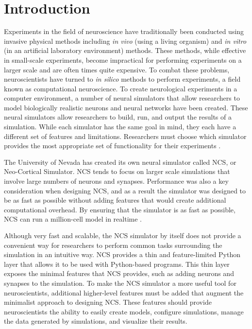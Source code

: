 \chapter{Introduction}
\label{chapter:intro}

Experiments in the field of neuroscience have traditionally been conducted using invasive physical methods including \emph{in vivo} (using a living organism) and \emph{in vitro} (in an artificial laboratory environment) methods. These methods, while effective in small-scale experiments, become impractical for performing experiments on a larger scale and are often times quite expensive. To combat these problems, neuroscientists have turned to \emph{in silico} methods to perform experiments, a field known as computational neuroscience. To create neurological experiments in a computer environment, a number of neural simulators that allow researchers to model biologically realistic neurons and neural networks have been created\cite{sejnowski1988computational}. These neural simulators allow researchers to build, run, and output the results of a simulation. While each simulator has the same goal in mind, they each have a different set of features and limitations. Researchers must choose which simulator provides the most appropriate set of functionality for their experiments \cite{brette2007simulation}.

The University of Nevada has created its own neural simulator called NCS, or Neo-Cortical Simulator. NCS tends to focus on larger scale simulations that involve large numbers of neurons and synapses. Performance was also a key consideration when designing NCS, and as a result the simulator was designed to be as fast as possible without adding features that would create additional computational overhead. By ensuring that the simulator is as fast as possible, NCS can run a million-cell model in realtime \cite{hoang2013novel}.

Although very fast and scalable, the NCS simulator by itself does not provide a convenient way for researchers to perform common tasks surrounding the simulation in an intuitive way. NCS provides a thin and feature-limited Python layer that allows it to be used with Python-based programs. This thin layer exposes the minimal features that NCS provides, such as adding neurons and synapses to the simulation. To make the NCS simulator a more useful tool for neuroscientists, additional higher-level features must be added that augment the minimalist approach to designing NCS. These features should provide neuroscientists the ability to easily create models, configure simulations, manage the data generated by simulations, and visualize their results. 

